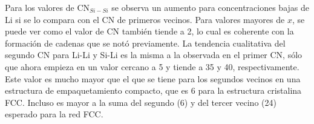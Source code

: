 Para los valores de CN$_{Si-Si}$ se observa un aumento para concentraciones bajas
de Li si se lo compara con el CN de primeros vecinos. Para valores mayores de $x$,
se puede ver como el valor de CN también tiende a 2, lo cual es coherente con la
formación de cadenas que se notó previamente. La tendencia cualitativa del segundo
CN para Li-Li y Si-Li es la misma a la observada en el primer CN, sólo que ahora
empieza en un valor cercano a 5 y tiende a 35 y 40, respectivamente. Este valor 
es mucho mayor que el que se tiene para los segundos vecinos en una estructura 
de empaquetamiento compacto, que es 6 para la estructura cristalina FCC. Incluso 
es mayor a la suma del segundo (6) y del tercer vecino (24) esperado para la red 
FCC.
